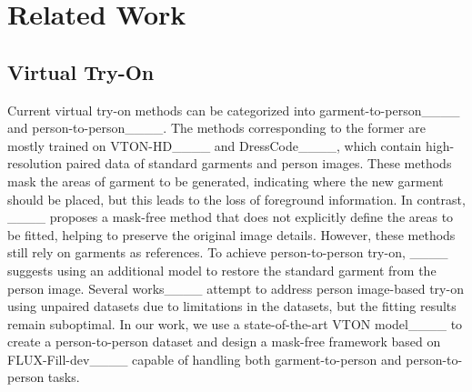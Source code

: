 \section{Related Work}
\label{sec:related}

\subsection{Virtual Try-On}
Current virtual try-on methods can be categorized into garment-to-person____ and person-to-person____. The methods corresponding to the former are mostly trained on VTON-HD____ and DressCode____, which contain high-resolution paired data of standard garments and person images. These methods mask the areas of garment to be generated, indicating where the new garment should be placed, but this leads to the loss of foreground information. In contrast, ____ proposes a mask-free method that does not explicitly define the areas to be fitted, helping to preserve the original image details. However, these methods still rely on garments as references. To achieve person-to-person try-on, ____ suggests using an additional model to restore the standard garment from the person image. Several works____ attempt to address person image-based try-on using unpaired datasets due to limitations in the datasets, but the fitting results remain suboptimal. In our work, we use a state-of-the-art VTON model____ to create a person-to-person dataset and design a mask-free framework based on FLUX-Fill-dev____ capable of handling both garment-to-person and person-to-person tasks.